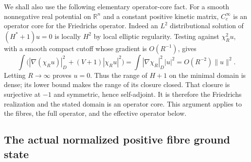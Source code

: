 We shall also use the following elementary operator-core fact.
For a smooth nonnegative real potential on $\mathbb R^n$ and a
constant positive kinetic matrix, $C_c^\infty$ is an operator core
for the Friedrichs operator. Indeed an $L^2$ distributional solution
of $(H^*+1)u=0$ is locally $H^2$ by local elliptic regularity.
Testing against $\chi_R^2u$, with a smooth compact cutoff whose
gradient is $O(R^{-1})$, gives
\[
 \int\bigl(|\nabla(\chi_Ru)|_D^2+(V+1)|\chi_Ru|^2\bigr)
 =\int|\nabla\chi_R|_D^2|u|^2=O(R^{-2})\|u\|^2.
\]
Letting $R\to\infty$ proves $u=0$. Thus the range of $H+1$ on
the minimal domain is dense; its lower bound makes the range of
its closure closed. That closure is surjective at $-1$ and symmetric,
hence self-adjoint. It is therefore the Friedrichs realization and
the stated domain is an operator core. This argument applies to
the fibres, the full operator, and the effective operator below.

\subsection{The actual normalized positive fibre ground state}

